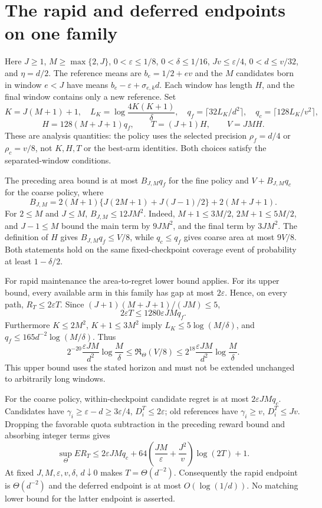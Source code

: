 \section{The rapid and deferred endpoints on one family}
\label{app:tradeoff}

Here $J\ge1$, $M\ge\max\{2,J\}$,
$0<\varepsilon\le1/8$, $0<\delta\le1/16$, $Jv\le\varepsilon/4$,
$0<d\le v/32$, and $\eta=d/2$. The reference means are
$b_e=1/2+ev$ and the $M$ candidates born in window $e<J$ have means
$b_e-\varepsilon+\sigma_{e,k}d$. Each window has length $H$, and the final
window contains only a new reference. Set
\[
 K=J(M+1)+1,\quad L_K=\log\frac{4K(K+1)}\delta,
 \quad q_f=\lceil32L_K/d^2\rceil,\quad q_c=\lceil128L_K/v^2\rceil,
\]
\[
 H=128(M+J+1)q_f,\qquad T=(J+1)H,\qquad V=JMH.
\]
These are analysis quantities: the policy uses the selected precision
$\rho_f=d/4$ or $\rho_c=v/8$, not $K,H,T$ or the best-arm identities.
Both choices satisfy the separated-window conditions.

The preceding area bound is at most $B_{J,M}q_f$ for the fine policy and
$V+B_{J,M}q_c$ for the coarse policy, where
\[
 B_{J,M}=2(M+1)\{J(2M+1)+J(J-1)/2\}+2(M+J+1).
\]
For $2\le M$ and $J\le M$, $B_{J,M}\le12JM^2$. Indeed,
$M+1\le3M/2$, $2M+1\le5M/2$, and $J-1\le M$ bound the main term by
$9JM^2$, and the final term by $3JM^2$. The definition of $H$ gives
$B_{J,M}q_f\le V/8$, while $q_c\le q_f$ gives coarse area at most $9V/8$.
Both statements hold on the same fixed-checkpoint coverage event of
probability at least $1-\delta/2$.

For rapid maintenance the area-to-regret lower bound applies. For its upper
bound, every available arm in this family has gap at most $2\varepsilon$.
Hence, on every path, $R_T\le2\varepsilon T$. Since
$(J+1)(M+J+1)/(JM)\le5$,
\[
 2\varepsilon T\le1280\varepsilon JM q_f.
\]
Furthermore $K\le2M^2$, $K+1\le3M^2$ imply
$L_K\le5\log(M/\delta)$, and
$q_f\le165d^{-2}\log(M/\delta)$. Thus
\[
 2^{-20}\frac{\varepsilon JM}{d^2}\log\frac M\delta
 \le\mathfrak R_\Theta(V/8)
 \le2^{18}\frac{\varepsilon JM}{d^2}\log\frac M\delta.
\]
This upper bound uses the stated horizon and must not be extended unchanged
to arbitrarily long windows.

For the coarse policy, within-checkpoint candidate regret is at most
$2\varepsilon JM q_c$. Candidates have
$\gamma_i\ge\varepsilon-d\ge3\varepsilon/4$, $D_i^T\le2\varepsilon$;
old references have $\gamma_i\ge v$, $D_i^T\le Jv$. Dropping the favorable
quota subtraction in the preceding reward bound and absorbing integer terms
gives
\[
 \sup_\Theta ER_T\le2\varepsilon JM q_c+
 64\left(\frac{JM}{\varepsilon}+\frac{J^2}{v}\right)\log(2T)+1.
\]
At fixed $J,M,\varepsilon,v,\delta$, $d\downarrow0$ makes
$T=\Theta(d^{-2})$. Consequently the rapid endpoint is $\Theta(d^{-2})$
and the deferred endpoint is at most $O(\log(1/d))$. No matching lower bound
for the latter endpoint is asserted.

